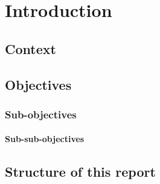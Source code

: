 \chapter{Introduction}
\label{chap:introduction}

\section{Context}

\lipsum[1]

\section{Objectives}

\lipsum[1]

\subsection{Sub-objectives}

\lipsum[1]

\subsubsection{Sub-sub-objectives}

\lipsum[1]

\section{Structure of this report}

\lipsum[1]
